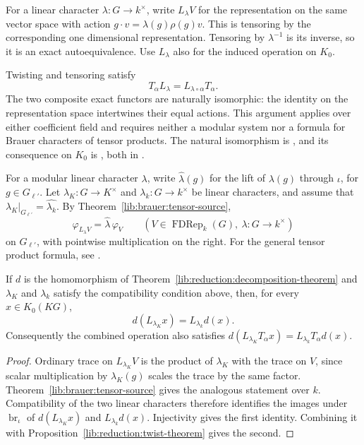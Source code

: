 For a linear character $\lambda:G\to k^{\times}$, write $L_{\lambda}V$
for the representation on the same vector space with action
$g\cdot v=\lambda(g)\rho(g)v$. This is tensoring by the corresponding
one dimensional representation. Tensoring by $\lambda^{-1}$ is its
inverse, so it is an exact autoequivalence. Use $L_{\lambda}$ also for
the induced operation on $K_0$.

Twisting and tensoring satisfy
\[
 T_\alpha L_\lambda=L_{\lambda\circ\alpha}T_\alpha.
\]
The two composite exact functors are naturally isomorphic: the identity
on the representation space intertwines their equal actions. This
argument applies over either coefficient field and requires neither a
modular system nor a formula for Brauer characters of tensor products.
The natural isomorphism is
, and its consequence
on $K_0$ is , both
in .

For a modular linear character $\lambda$, write $\widehat\lambda(g)$
for the lift of $\lambda(g)$ through $\iota$, for $g\in G_{\ell'}$.
Let $\lambda_K:G\to K^{\times}$ and $\lambda_k:G\to k^{\times}$
be linear characters, and assume that
$\lambda_K\big|_{G_{\ell'}}=\widehat{\lambda_k}$.
By Theorem~\ref{lib:brauer:tensor-source},
\[
 \varphi_{L_{\lambda}V}=\widehat\lambda\,\varphi_V
 \qquad(V\in\operatorname{FDRep}_k(G),\ \lambda:G\to k^{\times})
\]
on $G_{\ell'}$, with pointwise multiplication on the right.
For the general tensor product formula, see
\cite[proof of Theorem~2.23]{Navarro1998}.

\begin{proposition}
\label{lib:reduction:tensor-theorem}
If $d$ is the homomorphism of
Theorem~\ref{lib:reduction:decomposition-theorem} and $\lambda_K$ and
$\lambda_k$ satisfy the compatibility condition above, then, for every
$x\in K_0(KG)$,
\[
 d(L_{\lambda_K}x)=L_{\lambda_k}d(x).
\]
Consequently the combined operation also satisfies
$d(L_{\lambda_K}T_{\alpha}x)=L_{\lambda_k}T_{\alpha}d(x)$.
\end{proposition}
\begin{proof}
Ordinary trace on $L_{\lambda_K}V$ is the product of $\lambda_K$ with
the trace on $V$, since scalar multiplication by $\lambda_K(g)$ scales
the trace by the same factor. Theorem~\ref{lib:brauer:tensor-source}
gives the analogous statement over $k$. Compatibility of the two linear characters
therefore identifies the images under $\operatorname{br}_{\iota}$ of
$d(L_{\lambda_K}x)$ and $L_{\lambda_k}d(x)$. Injectivity gives the first
identity. Combining it with Proposition~\ref{lib:reduction:twist-theorem}
gives the second.
\end{proof}


